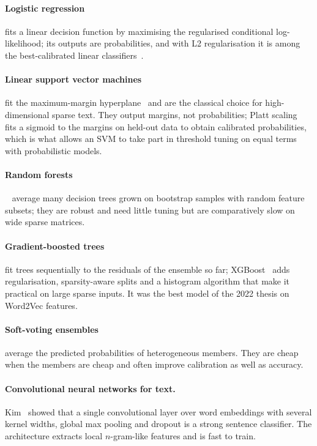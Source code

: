 \paragraph{Logistic regression} fits a linear decision function by maximising the regularised conditional log-likelihood; its outputs are probabilities, and with L2 regularisation it is among the best-calibrated linear classifiers~\cite{niculescu2005}.

\paragraph{Linear support vector machines} fit the maximum-margin hyperplane~\cite{joachims1998} and are the classical choice for high-dimensional sparse text. They output margins, not probabilities; Platt scaling~\cite{platt1999} fits a sigmoid to the margins on held-out data to obtain calibrated probabilities, which is what allows an SVM to take part in threshold tuning on equal terms with probabilistic models.

\paragraph{Random forests}~\cite{breiman2001} average many decision trees grown on bootstrap samples with random feature subsets; they are robust and need little tuning but are comparatively slow on wide sparse matrices.

\paragraph{Gradient-boosted trees} fit trees sequentially to the residuals of the ensemble so far; XGBoost~\cite{chen2016} adds regularisation, sparsity-aware splits and a histogram algorithm that make it practical on large sparse inputs. It was the best model of the 2022 thesis on Word2Vec features.

\paragraph{Soft-voting ensembles} average the predicted probabilities of heterogeneous members. They are cheap when the members are cheap and often improve calibration as well as accuracy.

\paragraph{Convolutional neural networks for text.} Kim~\cite{kim2014} showed that a single convolutional layer over word embeddings with several kernel widths, global max pooling and dropout is a strong sentence classifier. The architecture extracts local $n$-gram-like features and is fast to train.

